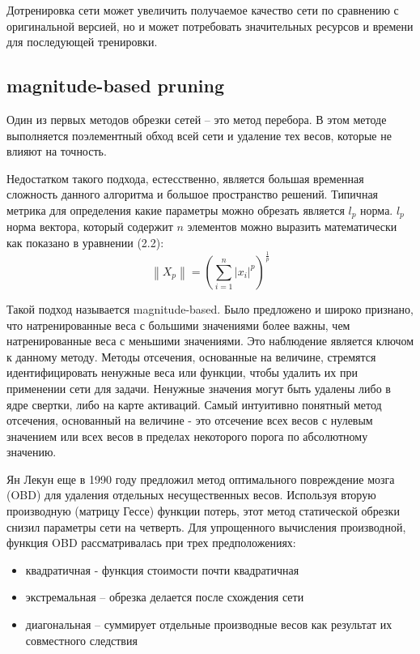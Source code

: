 \documentclass[oneside,final,12pt]{extreport}
\begin{document}
Дотренировка сети может увеличить получаемое качество сети по сравнению с оригинальной версией, но и может потребовать значительных ресурсов и времени для последующей тренировки.

\subsection{magnitude-based pruning}
Один из первых методов обрезки сетей – это метод перебора. В этом методе выполняется поэлементный обход всей сети и удаление тех весов, которые не влияют на точность.

Недостатком такого подхода, естесственно, является большая временная сложность данного алгоритма и большое пространство решений. Типичная метрика для определения какие параметры можно обрезать является $l_p$ норма. $l_p$ норма вектора, который содержит $n$ элементов можно выразить математически как показано в уравнении (2.2):
\begin{equation}
    \left \|X_p  \right \| = (\sum_{i=1}^{n}\left | x_i \right |^p)^{\frac{1}{p}}
\end{equation}

Такой подход называется magnitude-based. Было предложено и широко признано, что натренированные веса с большими значениями более важны, чем натренированные веса с меньшими значениями. Это наблюдение является ключом к данному методу.
Методы отсечения, основанные на величине, стремятся идентифицировать ненужные веса или функции, чтобы удалить их при применении сети для задачи. Ненужные значения могут быть удалены либо в ядре свертки, либо на карте активаций. Самый интуитивно понятный метод отсечения, основанный на величине - это отсечение всех весов с нулевым значением или всех весов в пределах некоторого порога по абсолютному значению.

Ян Лекун еще в 1990 году предложил метод оптимального повреждение мозга (OBD) для удаления отдельных несущественных весов. Используя вторую производную (матрицу Гессе) функции потерь, этот метод статической обрезки снизил параметры сети на четверть. Для упрощенного вычисления производной, функция OBD рассматривалась при трех предположениях: 
\begin{itemize}
    \item квадратичная - функция стоимости почти квадратичная
    \item экстремальная – обрезка делается после схождения сети
    \item диагональная – суммирует отдельные производные весов как результат их совместного следствия
\end{itemize}
\end{document}
